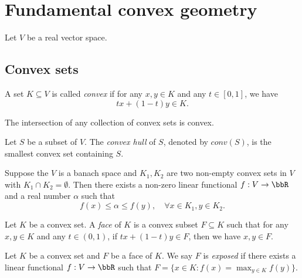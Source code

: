 \section{Fundamental convex geometry}

  Let $V$ be a real vector space.

\subsection{Convex sets}

  \begin{definition}
    A set $K \subseteq V$ is called \emph{convex} if for any $x, y \in K$ and any $t \in [0, 1]$, we have
    \[t x + (1 - t) y \in K.\]
  \end{definition}

  \begin{example}
    \Yang{}
  \end{example}

  \begin{proposition}
    The intersection of any collection of convex sets is convex.
  \end{proposition}

  \begin{definition}
    Let $S$ be a subset of $V$.
    The \emph{convex hull} of $S$, denoted by $conv(S)$, is the smallest convex set containing $S$.
  \end{definition}

  \begin{theorem}
    Suppose the $V$ is a banach space and $K_1, K_2$ are two non-empty convex sets in $V$ with $K_1 \cap K_2 = \emptyset$.
    Then there exists a non-zero linear functional $f: V \to \bbR$ and a real number $\alpha$ such that
    \[f(x) \leq \alpha \leq f(y), \quad \forall x \in K_1, y \in K_2.\]
  \end{theorem}

  \begin{definition}
    Let $K$ be a convex set.
    A \emph{face} of $K$ is a convex subset $F \subseteq K$ such that for any $x, y \in K$ and any $t \in (0, 1)$, if $t x + (1 - t) y \in F$, then we have $x, y \in F$.
  \end{definition}

  \begin{definition}
    Let $K$ be a convex set and $F$ be a face of $K$.
    We say $F$ is \emph{exposed} if there exists a linear functional $f: V \to \bbR$ such that $F = \{x \in K : f(x) = \max_{y \in K} f(y)\}$.

  \end{definition}


